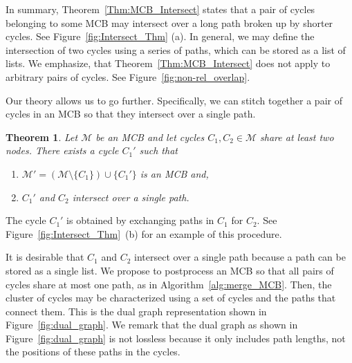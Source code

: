\documentclass[fleqn,11pt]{article}
\newtheorem{theorem}{Theorem}
\newcommand\calM{\mathcal{M}}
\begin{document}
In summary, Theorem~\ref{Thm:MCB_Intersect} states that a pair of cycles belonging to some MCB may intersect over a long path broken up by shorter cycles. 
See Figure~\ref{fig:Intersect_Thm} (a). 
In general, we may define the intersection of two cycles using a series of paths, which can be stored as a list of lists. 
We emphasize, that Theorem~\ref{Thm:MCB_Intersect} does not apply to arbitrary pairs of cycles. 
See Figure~\ref{fig:non-rel_overlap}.

Our theory allows us to go further. Specifically, we can stitch together a pair of cycles in an MCB so that they intersect over a single path.



%

\begin{theorem}
	Let $\calM$ be an MCB and let cycles $C_1,C_2\in\calM$ share at least two nodes. There exists a cycle $C_1'$ such that 
	\begin{enumerate}
		\item $\calM'=(\calM\setminus\{C_1\})\cup\{C_1'\}$ is an MCB and,
		\item $C_1'$ and $C_2$ intersect over a single path.
	\end{enumerate}
	\label{Thm:MCB_Pair_Swap}
\end{theorem}

\noindent The cycle $C_1'$ is obtained by exchanging paths in $C_1$ for $C_2$. See Figure~\ref{fig:Intersect_Thm}~(b) for an example of this procedure.

It is desirable that $C_1$ and $C_2$ intersect over a single path because a path can be stored as a single list. We propose to postprocess an MCB so that all pairs of cycles share at most one path, as in Algorithm~\ref{alg:merge_MCB}. Then, the cluster of cycles may be characterized using a set of cycles and the paths that connect them. This is the dual graph representation shown in Figure~\ref{fig:dual_graph}. We remark that the dual graph as shown in Figure~\ref{fig:dual_graph} is not lossless because it only includes path lengths, not the positions of these paths in the cycles.
\end{document}
